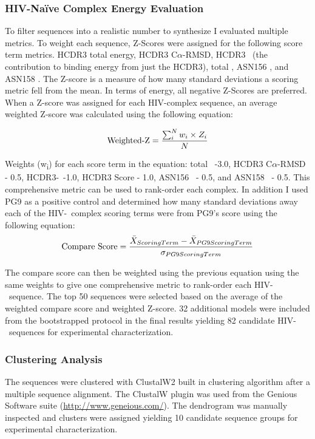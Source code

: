 \subsubsection{HIV-Na\"{i}ve Complex Energy Evaluation}
To filter \naive sequences into a realistic number to synthesize I evaluated multiple metrics. To weight each sequence, Z-Scores were assigned for the following score term metrics. HCDR3 total energy, HCDR3 C$\alpha$-RMSD, HCDR3 \ddg~(the contribution to binding energy from just the HCDR3), total \ddg, ASN156 \ddg, and ASN158 \ddg. The Z-score is a measure of how many standard deviations a scoring metric fell from the mean. In terms of energy, all negative Z-Scores are preferred. When a Z-score was assigned for each HIV-\naive complex sequence, an average weighted Z-score was calculated using the following equation:

\begin{gather*}
\textup{Weighted-Z} = \frac{\sum_{i}^{N}w_{i}\times Z_{i}}{N}
\end{gather*}

Weights (w\textsubscript{i}) for each score term in the equation: total \ddg~-3.0, HCDR3 C$\alpha$-RMSD - 0.5, HCDR3-\ddg~-1.0, HCDR3 Score - 1.0, ASN156 \ddg~- 0.5, and ASN158 \ddg~- 0.5. This comprehensive metric can be used to rank-order each complex. In addition I used PG9 as a positive control and determined how many standard deviations away each of the HIV-\naive~complex scoring terms were from PG9's score using the following equation:
\begin{gather*}
\textup{Compare Score} = \frac{\bar{X}_{Scoring Term}-\bar{X}_{PG9 Scoring Term}}{\sigma_{PG9 Scoring Term}}
\end{gather*}

The compare score can then be weighted using the previous equation using the same weights to give one comprehensive metric to rank-order each HIV-\naive~sequence. The top 50 sequences were selected based on the average of the weighted compare score and weighted Z-score. 32 additional models were included from the bootstrapped protocol in the final results yielding 82 candidate HIV-\naive~sequences for experimental characterization.

\subsubsection{Clustering Analysis}
The sequences were clustered with ClustalW2 built in clustering algorithm after a multiple sequence alignment. The ClustalW plugin was used from the Genious Software suite (\url{http://www.geneious.com/}). The dendrogram was manually inspected and clusters were assigned yielding 10 candidate sequence groups for experimental characterization.

